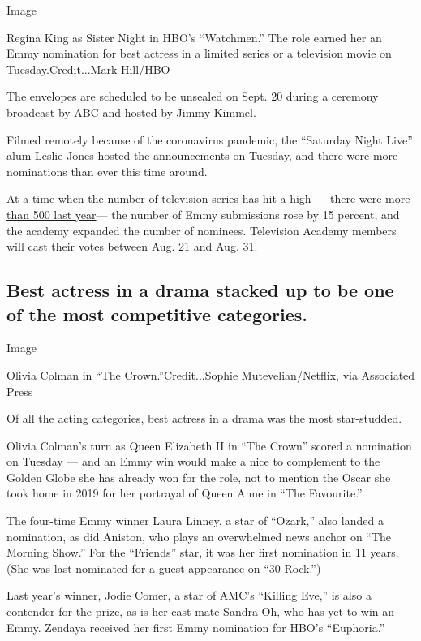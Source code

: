 Image

Regina King as Sister Night in HBO's ``Watchmen.'' The role earned her
an Emmy nomination for best actress in a limited series or a television
movie on Tuesday.Credit...Mark Hill/HBO

The envelopes are scheduled to be unsealed on Sept. 20 during a ceremony
broadcast by ABC and hosted by Jimmy Kimmel.

Filmed remotely because of the coronavirus pandemic, the ``Saturday
Night Live'' alum Leslie Jones hosted the announcements on Tuesday, and
there were more nominations than ever this time around.

At a time when the number of television series has hit a high --- there
were
\href{https://www.nytimes3xbfgragh.onion/2020/01/09/business/media/tv-shows-2020.html}{more
than 500 last year}--- the number of Emmy submissions rose by 15
percent, and the academy expanded the number of nominees. Television
Academy members will cast their votes between Aug. 21 and Aug. 31.

\hypertarget{best-actress-in-a-drama-stacked-up-to-be-one-of-the-most-competitive-categories}{%
\subsection{Best actress in a drama stacked up to be one of the most
competitive
categories.}\label{best-actress-in-a-drama-stacked-up-to-be-one-of-the-most-competitive-categories}}

Image

Olivia Colman in ``The Crown.''Credit...Sophie Mutevelian/Netflix, via
Associated Press

Of all the acting categories, best actress in a drama was the most
star-studded.

Olivia Colman's turn as Queen Elizabeth II in ``The Crown'' scored a
nomination on Tuesday --- and an Emmy win would make a nice to
complement to the Golden Globe she has already won for the role, not to
mention the Oscar she took home in 2019 for her portrayal of Queen Anne
in ``The Favourite.''

The four-time Emmy winner Laura Linney, a star of ``Ozark,'' also landed
a nomination, as did Aniston, who plays an overwhelmed news anchor on
``The Morning Show.'' For the ``Friends'' star, it was her first
nomination in 11 years. (She was last nominated for a guest appearance
on ``30 Rock.'')

Last year's winner, Jodie Comer, a star of AMC's ``Killing Eve,'' is
also a contender for the prize, as is her cast mate Sandra Oh, who has
yet to win an Emmy. Zendaya received her first Emmy nomination for HBO's
``Euphoria.''

